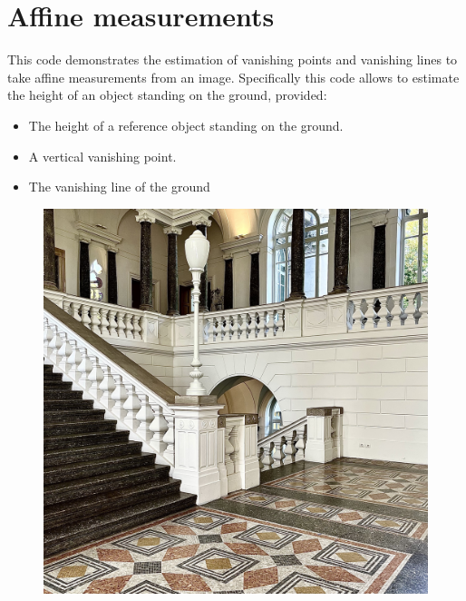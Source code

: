 \documentclass[12pt, a4paper]{report}
\newtheorem[style=M,bodystyle=\normalfont]{theorem}{Theorem}
\newtheorem[style=M,bodystyle=\normalfont]{corollary}{Corollary}
\newtheorem[style=M,bodystyle=\normalfont]{lemma}{Lemma}
\newtheorem[style=M,bodystyle=\normalfont]{definition}{Definition}
\begin{document}
    \section{Affine measurements}
    This code demonstrates the estimation of vanishing points and vanishing lines to take affine measurements from an image. Specifically this code allows to estimate the 
    height of an object standing on the ground, provided:
    \begin{itemize}
        \item The height of a reference object standing on the ground. 
        \item A vertical vanishing point. 
        \item The vanishing line of the ground
    \end{itemize}
    \begin{figure}[H]
        \centering
        \includegraphics[width=0.75\linewidth]{images/poli2.png}
    \end{figure}
\end{document}
